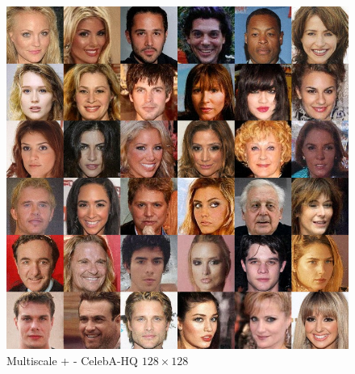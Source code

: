 \begin{figure}
    \centering
    \includegraphics[width=\textwidth]{Chapter2/samples/multiscale/multiscale_deep.png}
    \caption{Multiscale + - CelebA-HQ $128\times 128$}
    \label{ch2:fig:Multiscale_+}
\end{figure}



